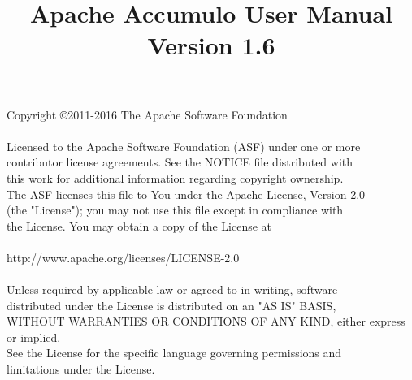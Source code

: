\documentclass[11pt]{report}
\title{Apache Accumulo User Manual\\
Version 1.6}
\makeatletter
\newcommand\frontmatter{%
    \cleardoublepage
  \pagenumbering{roman}}
\newcommand\mainmatter{%
    \cleardoublepage
  \pagenumbering{arabic}}
\makeatother
\begin{document}
\frontmatter
\maketitle
\null\vfill
\noindent
Copyright \copyright 2011-2016 The Apache Software Foundation\\
\\
Licensed to the Apache Software Foundation (ASF) under one or more\\
contributor license agreements. See the NOTICE file distributed with\\
this work for additional information regarding copyright ownership.\\
The ASF licenses this file to You under the Apache License, Version 2.0\\
(the "License"); you may not use this file except in compliance with\\
the License. You may obtain a copy of the License at\\
\\
    http://www.apache.org/licenses/LICENSE-2.0\\
\\
Unless required by applicable law or agreed to in writing, software\\
distributed under the License is distributed on an "AS IS" BASIS,\\
WITHOUT WARRANTIES OR CONDITIONS OF ANY KIND, either express or implied.\\
See the License for the specific language governing permissions and\\
limitations under the License.
\tableofcontents
\mainmatter















\appendix

\end{document}
